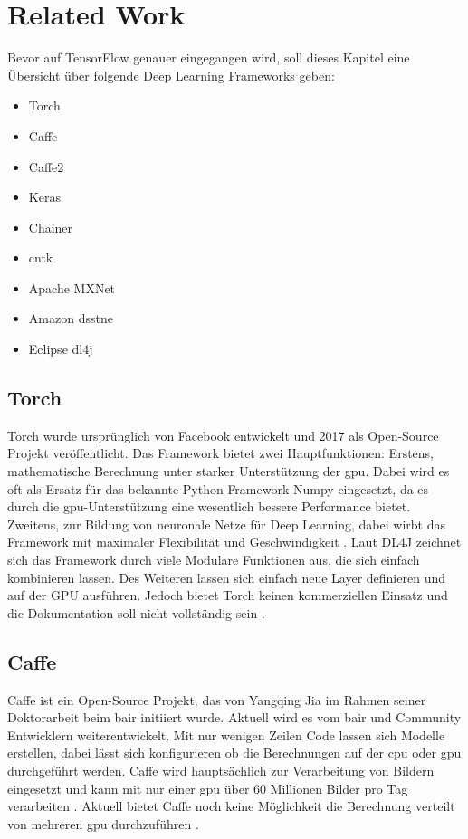 \section{Related Work}
Bevor auf TensorFlow genauer eingegangen wird, soll dieses Kapitel eine Übersicht über folgende Deep Learning Frameworks geben:
\begin{multicols}{2}
	\begin{itemize}
		\item Torch
		\item Caffe
		\item Caffe2
		\item Keras
		\item Chainer
		\item \acs{cntk}
		\item Apache MXNet
		\item Amazon \acs{dsstne}
		\item Eclipse \acl{dl4j}
	\end{itemize}
\end{multicols}
	
\subsection{Torch}
Torch wurde ursprünglich von Facebook entwickelt und 2017 als Open-Source Projekt veröffentlicht. Das Framework bietet zwei Hauptfunktionen: Erstens, mathematische Berechnung unter starker Unterstützung der \ac{gpu}. Dabei wird es oft als Ersatz für das bekannte Python Framework Numpy eingesetzt, da es durch die \ac{gpu}-Unterstützung eine wesentlich bessere Performance bietet. Zweitens, zur Bildung von neuronale Netze für Deep Learning, dabei wirbt das Framework mit maximaler Flexibilität und Geschwindigkeit \cite{Torch}. Laut DL4J zeichnet sich das Framework durch viele Modulare Funktionen aus, die sich einfach kombinieren lassen. Des Weiteren lassen sich einfach neue Layer definieren und auf der GPU ausführen. Jedoch bietet Torch keinen kommerziellen Einsatz und die Dokumentation soll nicht vollständig sein \cite{DeepLearningFrameworks}. 

\subsection{Caffe}
Caffe ist ein Open-Source Projekt, das von Yangqing Jia im Rahmen seiner Doktorarbeit beim \ac{bair} initiiert wurde. Aktuell wird es vom \ac{bair} und Community Entwicklern weiterentwickelt. Mit nur wenigen Zeilen Code lassen sich Modelle erstellen, dabei lässt sich konfigurieren ob die Berechnungen auf der \acs{cpu} oder \ac{gpu} durchgeführt werden. Caffe wird hauptsächlich zur Verarbeitung von Bildern eingesetzt und kann mit nur einer \ac{gpu} über 60 Millionen Bilder pro Tag verarbeiten \cite{Caffe}. Aktuell bietet Caffe noch keine Möglichkeit die Berechnung verteilt von mehreren \ac{gpu} durchzuführen \cite{DeepLearningFrameworks}.

